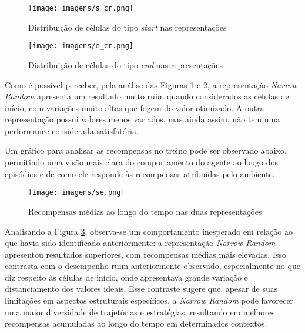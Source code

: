\begin{figure}[htb]
	\caption{\label{s_cr}Distribuição de células do tipo \textit{start} nas representações }
	\begin{center}
	    \texttt{[image: imagens/s\_cr.png]}
	\end{center}
\end{figure}

\begin{figure}[htb]
	\caption{\label{e_cr}Distribuição de células do tipo \textit{end} nas representações }
	\begin{center}
	    \texttt{[image: imagens/e\_cr.png]}
	\end{center}
\end{figure}


\FloatBarrier

Como é possível perceber, pela análise das Figuras \ref{s_cr} e \ref{e_cr}, a representação \textit{Narrow Random} apresenta um resultado
muito ruim quando considerados as células de início, com variações muito altas que fogem do valor otimizado. A outra
representação possui valores menos variados, mas ainda assim, não tem uma performance considerada satisfatória. 

Um gráfico para analisar as recompensas no treino pode ser observado abaixo, 
permitindo uma visão mais clara do comportamento do agente ao longo dos episódios e de 
como ele responde às recompensas atribuídas pelo ambiente. 
\begin{figure}[htb]
	\caption{\label{se}Recompensas médias ao longo do tempo nas duas representações}
	\begin{center}
	    \texttt{[image: imagens/se.png]}
	\end{center}
\end{figure}

\FloatBarrier

Analisando a Figura \ref{se}, observa-se um comportamento inesperado em relação ao que havia sido identificado 
anteriormente: a representação \textit{Narrow Random} apresentou resultados superiores, 
com recompensas médias mais elevadas. Isso contrasta com o desempenho ruim anteriormente observado, 
especialmente no que diz respeito às células de início, onde apresentava grande variação e distanciamento 
dos valores ideais. Esse contraste sugere que, apesar de suas limitações em aspectos estruturais específicos, 
a \textit{Narrow Random} pode favorecer uma maior diversidade de trajetórias e estratégias, 
resultando em melhores recompensas acumuladas ao longo do tempo em determinados contextos.

